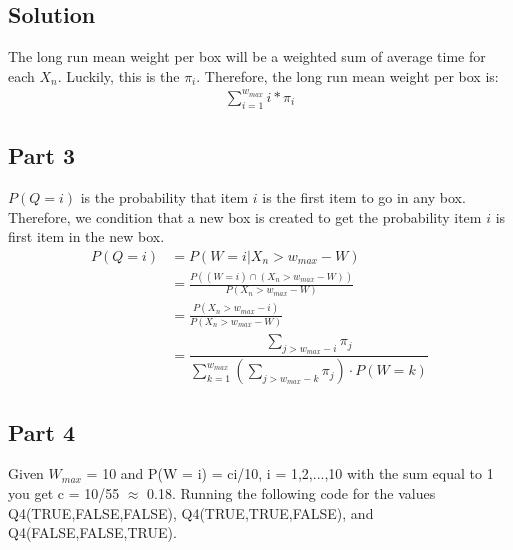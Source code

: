 \documentclass[10pt,a4paper]{article}
\begin{document}
\subsection*{Solution}
The long run mean weight per box will be a weighted sum of average time for each $X_n$. Luckily, this is the $\pi_i$. Therefore, the long run mean weight per box is:
\begin{align*}
\sum_{i=1}^{w_{max}} i*\pi_i
\end{align*}


\subsection{Part 3}
$P(Q=i)$ is the probability that item $i$ is the first item to go in any box. Therefore, we condition that a new box is created to get the probability item $i$ is first item in the new box.\\

\begin{align*}
P(Q=i) &= P(W=i | X_n > w_{max} - W) \\
&= \frac{P( ( W=i ) \cap (X_n > w_{max} - W))}{P(X_n > w_{max} - W)}\\
&= \frac{P(X_n > w_{max} - i)}{P(X_n > w_{max} - W)} \\
&= \dfrac{\sum\limits_{j > w_{max} - i} \pi_j }{\sum\limits_{k=1}^{w_{max}} \left(\sum\limits_{j > w_{max} -k} \pi_j \right) \cdot P(W=k)}
\end{align*}

\subsection{Part 4}
Given $W_{max}$ = 10 and P(W = i) = ci/10, i = 1,2,...,10 with the sum equal to 1 you get c = 10/55 $\approx$ 0.18. Running the following code for the values Q4(TRUE,FALSE,FALSE), Q4(TRUE,TRUE,FALSE), and Q4(FALSE,FALSE,TRUE).
 
\end{document}
